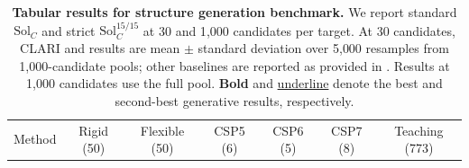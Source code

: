 
\begin{table}[H]
\centering
\caption{\textbf{Tabular results for structure generation benchmark.}
We report standard $\mathrm{Sol}_C$ and strict $\mathrm{Sol}_C^{15/15}$ at
30 and 1{,}000 candidates per target. At 30 candidates, CLARI and \model{}
results are mean $\pm$ standard deviation over 5{,}000 resamples from
1{,}000-candidate pools; other baselines are reported as provided in \citet{jin2025oxtal}.
Results at 1{,}000 candidates use the full pool.
\textbf{Bold} and \underline{underline} denote the best and second-best
generative results, respectively.}
\label{tab:benchmark_solc_main}
\small
\setlength{\tabcolsep}{3.5pt}
\begin{tabular}{lcccccc}
\toprule
Method & Rigid (50) & Flexible (50) & CSP5 (6) & CSP6 (5) & CSP7 (8) & Teaching (773) \\


\end{tabular}
\end{table}
